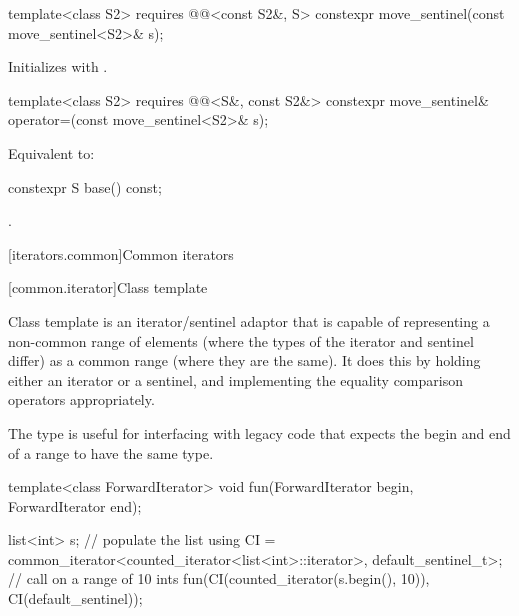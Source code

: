 %
\begin{itemdecl}
template<class S2>
  requires @@<const S2&, S>
    constexpr move_sentinel(const move_sentinel<S2>& s);
\end{itemdecl}

\begin{itemdescr}
\pnum
\effects
Initializes  with .
\end{itemdescr}

%
%
\begin{itemdecl}
template<class S2>
  requires @@<S&, const S2&>
    constexpr move_sentinel& operator=(const move_sentinel<S2>& s);
\end{itemdecl}

\begin{itemdescr}
\pnum
\effects
Equivalent to: 
\end{itemdescr}

%
\begin{itemdecl}
constexpr S base() const;
\end{itemdecl}

\begin{itemdescr}
\pnum
\returns
{}.
\end{itemdescr}

[iterators.common]{Common iterators}

[common.iterator]{Class template }

\pnum
Class template  is an iterator/sentinel adaptor that is
capable of representing a non-common range of elements (where the types of the
iterator and sentinel differ) as a common range (where they are the same). It
does this by holding either an iterator or a sentinel, and implementing the
equality comparison operators appropriately.

\pnum
\begin{note}
The  type is useful for interfacing with legacy
code that expects the begin and end of a range to have the same type.
\end{note}

\pnum
\begin{example}
\begin{codeblock}
template<class ForwardIterator>
void fun(ForwardIterator begin, ForwardIterator end);

list<int> s;
// populate the list 
using CI = common_iterator<counted_iterator<list<int>::iterator>, default_sentinel_t>;
// call  on a range of 10 ints
fun(CI(counted_iterator(s.begin(), 10)), CI(default_sentinel));
\end{codeblock}
\end{example}

